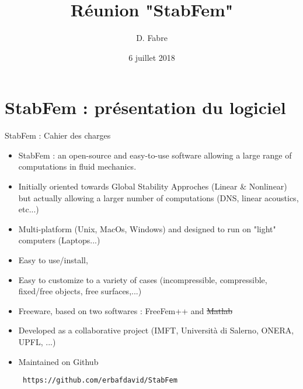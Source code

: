 \documentclass{beamer}
\title{Réunion "StabFem"}
\subtitle{}
\author{D. Fabre}
\institute{IMFT, groupe Interface}
\date{6 juillet 2018}
\newcommand{\ssp}{\vspace{.2cm} }
\begin{document}
\begin{frame}

\titlepage

\end{frame}

\section{StabFem : présentation du logiciel}

\begin{frame}{StabFem : Cahier des charges }

\begin{itemize}[<+->]

\item StabFem : an open-source and easy-to-use software allowing a large range of computations in fluid mechanics.

\item Initially  oriented towards Global Stability Approches (Linear \& Nonlinear) but actually allowing a larger number of computations
(DNS, linear acoustics, etc...)

\item Multi-platform (Unix, MacOs, Windows) and designed to run on "light" computers (Laptops...)

\item Easy to use/install,

\item Easy to customize to a variety of cases (incompressible, compressible, fixed/free objects, free surfaces,...)

\item Freeware, based on two softwares : FreeFem++ and \sout{Matlab} %

\item Developed as a collaborative project
(IMFT, Università di Salerno, ONERA, UPFL, ...)

\item Maintained on Github

\ssp
{\color{orange}
\verb! https://github.com/erbafdavid/StabFem !
}

\end{itemize}

\end{frame}
\end{document}
